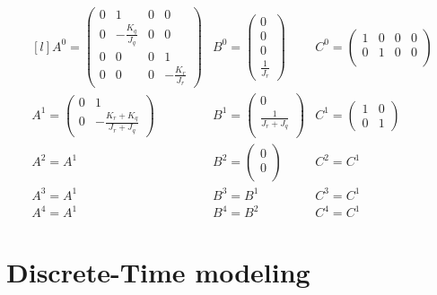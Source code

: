 \documentclass[english,12pt,a4paper]{article}
\begin{document}
			\begin{equation}
				\begin{matrix*}[l]
					A^0 = \begin{pmatrix}
						0 & 1 & 0 & 0 \\
						0 & -\frac{K_q}{J_q} & 0 & 0\\
						0 & 0 & 0 & 1 \\
						0 & 0 & 0 & -\frac{K_r}{J_r}
					\end{pmatrix}&
					B^0 = \begin{pmatrix}
						0 \\
						0 \\
						0 \\
						\frac{1}{J_r}
					\end{pmatrix}&
					C^0 = \begin{pmatrix}
						1 & 0 & 0 & 0 \\
						0 & 1 & 0 & 0 \\
					\end{pmatrix} \\
					A^1 = \begin{pmatrix}
						0 & 1 \\
						0 & -\frac{K_r+K_q}{J_r+J_q}
					\end{pmatrix}&
					B^1 = \begin{pmatrix}
						0 \\
						\frac{1}{J_r+J_q}\\
					\end{pmatrix}&
					C^1 = \begin{pmatrix}
						1 & 0 \\
						0 & 1
					\end{pmatrix} \\
					A^2 = A^1&
					B^2 = \begin{pmatrix}
						0 \\
						0 \\
					\end{pmatrix}&
					C^2 = C^1 \\
					A^3 = A^1&
					B^3 = B^1&
					C^3 = C^1 \\
					A^4 = A^1&
					B^4 = B^2&
					C^4 = C^1
				\end{matrix*}
			\end{equation}
		
		
\section{Discrete-Time modeling}
\end{document}
